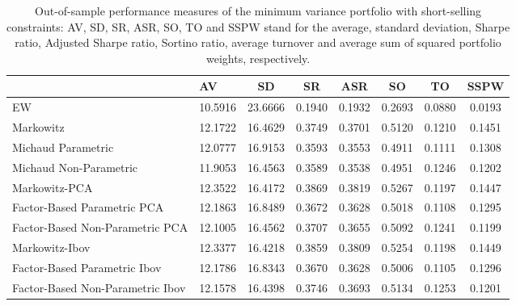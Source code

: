 \begin{table}

\caption{\label{tab:empirical_mvp}Out-of-sample performance measures of the minimum variance portfolio with short-selling constraints: AV, SD, SR, ASR, SO, TO and SSPW stand for the average, standard deviation, Sharpe ratio, Adjusted Sharpe ratio, Sortino ratio, average turnover and average sum of squared portfolio weights, respectively.}
\centering
\begin{tabular}[t]{l|l|c|c|c|c|c|c}
\hline
  & AV & SD & SR & ASR & SO & TO & SSPW\\
\hline
EW & 10.5916 & 23.6666 & 0.1940 & 0.1932 & 0.2693 & 0.0880 & 0.0193\\
\hline
Markowitz & 12.1722 & 16.4629 & 0.3749 & 0.3701 & 0.5120 & 0.1210 & 0.1451\\
\hline
Michaud Parametric & 12.0777 & 16.9153 & 0.3593 & 0.3553 & 0.4911 & 0.1111 & 0.1308\\
\hline
Michaud Non-Parametric & 11.9053 & 16.4563 & 0.3589 & 0.3538 & 0.4951 & 0.1246 & 0.1202\\
\hline
Markowitz-PCA & 12.3522 & 16.4172 & 0.3869 & 0.3819 & 0.5267 & 0.1197 & 0.1447\\
\hline
Factor-Based Parametric PCA & 12.1863 & 16.8489 & 0.3672 & 0.3628 & 0.5018 & 0.1108 & 0.1295\\
\hline
Factor-Based Non-Parametric PCA & 12.1005 & 16.4562 & 0.3707 & 0.3655 & 0.5092 & 0.1241 & 0.1199\\
\hline
Markowitz-Ibov & 12.3377 & 16.4218 & 0.3859 & 0.3809 & 0.5254 & 0.1198 & 0.1449\\
\hline
Factor-Based Parametric Ibov & 12.1786 & 16.8343 & 0.3670 & 0.3628 & 0.5006 & 0.1105 & 0.1296\\
\hline
Factor-Based Non-Parametric Ibov & 12.1578 & 16.4398 & 0.3746 & 0.3693 & 0.5134 & 0.1253 & 0.1201\\
\hline
\end{tabular}
\end{table}
